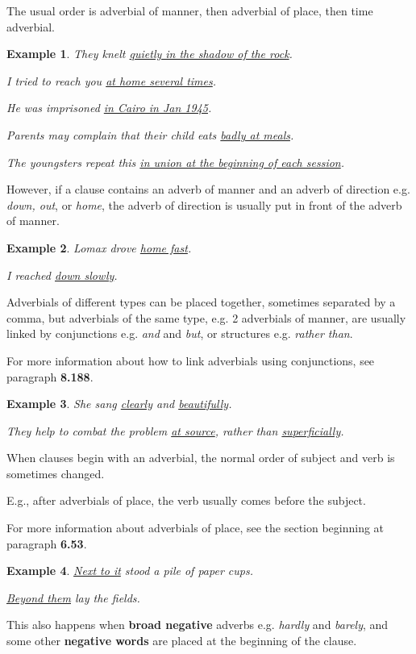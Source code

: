 \documentclass[oneside]{book}
\numberwithin{equation}{section}
\newtheorem{example}{Example}[section]
\begin{document}
The usual order is adverbial of manner, then adverbial of place, then time adverbial.
\begin{example}
    They knelt \underline{quietly in the shadow of the rock}.
    
    I tried to reach you \underline{at home several times}.
    
    He was imprisoned \underline{in Cairo in Jan 1945}.
    
    Parents may complain that their child eats \underline{badly at meals}.
    
    The youngsters repeat this \underline{in union at the beginning of each session}.
\end{example}
However, if a clause contains an adverb of manner and an adverb of direction e.g. \textit{down, out}, or \textit{home}, the adverb of direction is usually put in front of the adverb of manner.
\begin{example}
    Lomax drove \underline{home fast}.
    
    I reached \underline{down slowly}.
\end{example}
%
\noindent{} Adverbials of different types can be placed together, sometimes separated by a comma, but adverbials of the same type, e.g. 2 adverbials of manner, are usually linked by conjunctions e.g. \textit{and} and \textit{but}, or structures e.g. \textit{rather than}.

For more information about how to link adverbials using conjunctions, see paragraph \textbf{8.188}.
\begin{example}
    She sang \underline{clearly} and \underline{beautifully}.
    
    They help to combat the problem \underline{at source}, rather than \underline{superficially}.
\end{example}
%
\noindent{} When clauses begin with an adverbial, the normal order of subject and verb is sometimes changed.

E.g., after adverbials of place, the verb usually comes before the subject.

For more information about adverbials of place, see the section beginning at paragraph \textbf{6.53}.
\begin{example}
    \underline{Next to it} stood a pile of paper cups.
    
    \underline{Beyond them} lay the fields.
\end{example}
This also happens when \textbf{broad negative} adverbs e.g. \textit{hardly} and \textit{barely}, and some other \textbf{negative words} are placed at the beginning of the clause.
\end{document}
